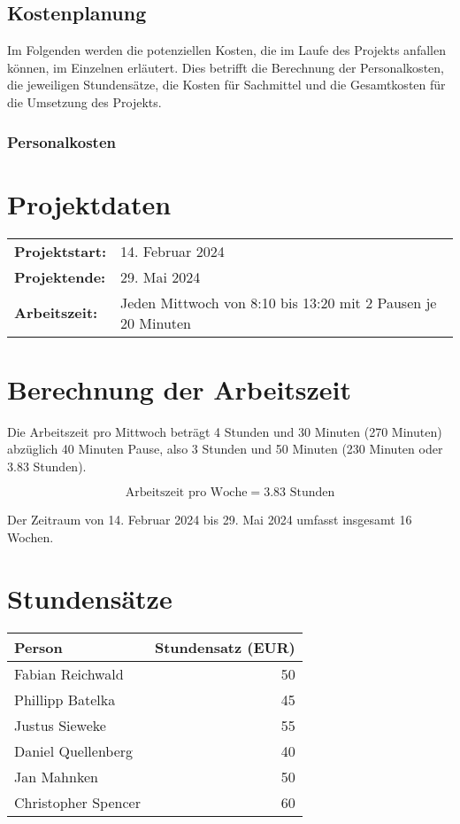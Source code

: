 \subsection{Kostenplanung}\label{kostenplanung}

Im Folgenden werden die potenziellen Kosten, die im Laufe des Projekts anfallen können, im Einzelnen erläutert. Dies betrifft die Berechnung der Personalkosten, die jeweiligen Stundensätze, die Kosten für Sachmittel und die Gesamtkosten für die Umsetzung des Projekts.

\subsubsection{Personalkosten}\label{personalkosten}

\section*{Projektdaten}
\begin{tabular}{ll}
  \toprule
  \textbf{Projektstart:} & 14. Februar 2024 \\
  \textbf{Projektende:} & 29. Mai 2024 \\
  \textbf{Arbeitszeit:} & Jeden Mittwoch von 8:10 bis 13:20 mit 2 Pausen je 20 Minuten \\
  \bottomrule
\end{tabular}

\section*{Berechnung der Arbeitszeit}
Die Arbeitszeit pro Mittwoch beträgt 4 Stunden und 30 Minuten (270 Minuten) abzüglich 40 Minuten Pause, also 3 Stunden und 50 Minuten (230 Minuten oder 3.83 Stunden).

\[
  \text{Arbeitszeit pro Woche} = 3.83 \text{ Stunden}
\]

Der Zeitraum von 14. Februar 2024 bis 29. Mai 2024 umfasst insgesamt 16 Wochen.

\section*{Stundensätze}
\begin{tabular}{lr}
  \toprule
  \textbf{Person} & \textbf{Stundensatz (EUR)} \\
  \midrule
  Fabian Reichwald & 50 \\
  Phillipp Batelka & 45 \\
  Justus Sieweke & 55 \\
  Daniel Quellenberg & 40 \\
  Jan Mahnken & 50 \\
  Christopher Spencer & 60 \\
  \bottomrule
\end{tabular}

